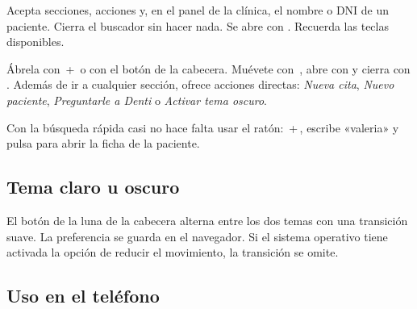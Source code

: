\documentclass[11pt]{article}
\begin{document}
\begin{leyenda}
   Acepta secciones, acciones y, en el panel de la clínica, el nombre o DNI de un paciente.
   Cierra el buscador sin hacer nada.
   Se abre con .
   Recuerda las teclas disponibles.
\end{leyenda}

Ábrela con \,+\, o con el botón  de la cabecera. Muévete con \tecla{$\uparrow$}\,\tecla{$\downarrow$}, abre con  y cierra con . Además de ir a cualquier sección, ofrece acciones directas: \textit{Nueva cita}, \textit{Nuevo paciente}, \textit{Preguntarle a Denti} o \textit{Activar tema oscuro}.

\begin{sdconsejo}
Con la búsqueda rápida casi no hace falta usar el ratón: \,+\,, escribe «valeria» y pulsa  para abrir la ficha de la paciente.
\end{sdconsejo}

\subsection{Tema claro u oscuro}

El botón de la luna  de la cabecera alterna entre los dos temas con una transición suave. La preferencia se guarda en el navegador. Si el sistema operativo tiene activada la opción de reducir el movimiento, la transición se omite.

\needspace{0.55\textheight}
\subsection{Uso en el teléfono}
\end{document}
